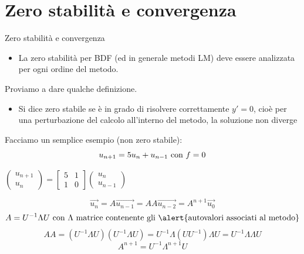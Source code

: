 \documentclass[aspectratio=169, 10pt, handout,usenames,dvipsnames]{beamer}
\begin{document}
\section{Zero stabilità e convergenza}\label{sec:sec9}
    \begin{frame}{Zero stabilità e convergenza}
        \begin{itemize}
            \item La zero stabilità per BDF (ed in generale metodi LM) deve essere analizzata per ogni ordine del metodo.
        \end{itemize}   
        Proviamo a dare qualche definizione.
        \begin{itemize}
            \item Si dice \alert{zero stabile} se è in grado di risolvere correttamente \( y'=0 \), cioè per una perturbazione del calcolo all’interno del metodo, la soluzione non diverge
        \end{itemize}
        
       Facciamo un semplice esempio (non zero stabile):
        \[u_{n+1} = 5 u_n + u_{n-1}  \textnormal{ con } f = 0\]
        \begin{center}
         $\begin{pmatrix}
            u_{n+1} \\ 
            u_{n}
         \end{pmatrix}
         =
         \begin{bmatrix}
                    5 & 1 \\
                    1 & 0
         \end{bmatrix}
        \begin{pmatrix}
            u_{n} \\ 
            u_{n-1}
         \end{pmatrix} $
         \end{center}
         \[\vec{u_n} = A \vec{u_{n-1}} = AA \vec{u_{n-2}}= A^{n+1} \vec{u_0} \]
         \[A = U^ {-1} \Lambda U  \textnormal{ con } \Lambda \textnormal{ matrice contenente gli \alert{autovalori associati al metodo}} \]
         \[AA = (U^ {-1} \Lambda U)(U^ {-1} \Lambda U) = U^{-1} \Lambda (U U^{-1}) \Lambda U = U^{-1} \Lambda \Lambda U \]
         \[A^{n+1} = U^{-1} \Lambda^{n+1} U\]
       

\end{frame}
\end{document}
